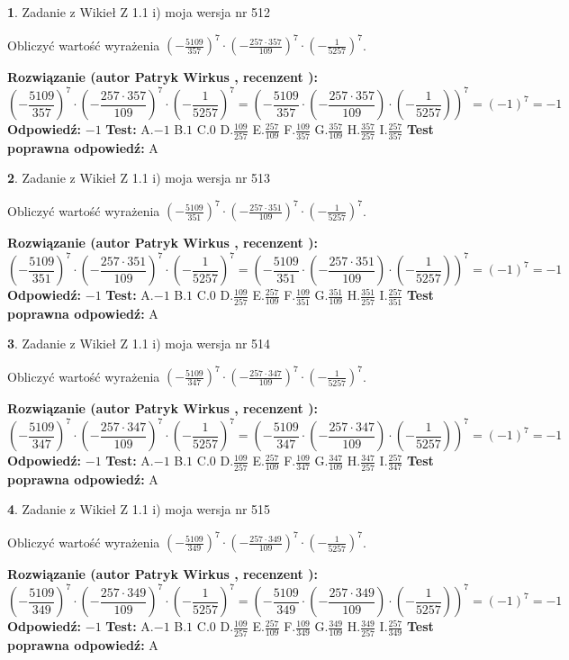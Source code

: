 \documentclass[12pt, a4paper]{article}
\theoremstyle{definition} %
\newtheorem{zad}{}
\newcommand{\zadStart}[1]{\begin{zad}#1\newline}
\newcommand{\zadStop}{\end{zad}}
\newcommand{\rozwStart}[2]{\noindent \textbf{Rozwiązanie (autor #1 , recenzent #2): }\newline}
\newcommand{\rozwStop}{\newline}
\newcommand{\odpStart}{\noindent \textbf{Odpowiedź:}\newline}
\newcommand{\odpStop}{\newline}
\newcommand{\testStart}{\noindent \textbf{Test:}\newline}
\newcommand{\testStop}{\newline}
\newcommand{\kluczStart}{\noindent \textbf{Test poprawna odpowiedź:}\newline}
\newcommand{\kluczStop}{\newline}
\begin{document}
\zadStart{Zadanie z Wikieł Z 1.1 i) moja wersja nr 512}

Obliczyć wartość wyrażenia $(-\frac{5109}{357})^{7} \cdot (-\frac{257 \cdot 357}{109})^{7} \cdot (-\frac{1}{5257})^{7}$.
\zadStop
\rozwStart{Patryk Wirkus}{}
$$(-\frac{5109}{357})^{7} \cdot (-\frac{257 \cdot 357}{109})^{7} \cdot (-\frac{1}{5257})^{7} = (-\frac{5109}{357} \cdot (-\frac{257 \cdot 357}{109}) \cdot (-\frac{1}{5257}))^{7} = (-1)^{7} = -1$$
\rozwStop
\odpStart
$-1$
\odpStop
\testStart
A.$-1$ B.$1$ C.$0$ D.$\frac{109}{257}$ E.$\frac{257}{109}$
F.$\frac{109}{357}$ G.$\frac{357}{109}$
H.$\frac{357}{257}$
I.$\frac{257}{357}$
\testStop
\kluczStart
A
\kluczStop



\zadStart{Zadanie z Wikieł Z 1.1 i) moja wersja nr 513}

Obliczyć wartość wyrażenia $(-\frac{5109}{351})^{7} \cdot (-\frac{257 \cdot 351}{109})^{7} \cdot (-\frac{1}{5257})^{7}$.
\zadStop
\rozwStart{Patryk Wirkus}{}
$$(-\frac{5109}{351})^{7} \cdot (-\frac{257 \cdot 351}{109})^{7} \cdot (-\frac{1}{5257})^{7} = (-\frac{5109}{351} \cdot (-\frac{257 \cdot 351}{109}) \cdot (-\frac{1}{5257}))^{7} = (-1)^{7} = -1$$
\rozwStop
\odpStart
$-1$
\odpStop
\testStart
A.$-1$ B.$1$ C.$0$ D.$\frac{109}{257}$ E.$\frac{257}{109}$
F.$\frac{109}{351}$ G.$\frac{351}{109}$
H.$\frac{351}{257}$
I.$\frac{257}{351}$
\testStop
\kluczStart
A
\kluczStop



\zadStart{Zadanie z Wikieł Z 1.1 i) moja wersja nr 514}

Obliczyć wartość wyrażenia $(-\frac{5109}{347})^{7} \cdot (-\frac{257 \cdot 347}{109})^{7} \cdot (-\frac{1}{5257})^{7}$.
\zadStop
\rozwStart{Patryk Wirkus}{}
$$(-\frac{5109}{347})^{7} \cdot (-\frac{257 \cdot 347}{109})^{7} \cdot (-\frac{1}{5257})^{7} = (-\frac{5109}{347} \cdot (-\frac{257 \cdot 347}{109}) \cdot (-\frac{1}{5257}))^{7} = (-1)^{7} = -1$$
\rozwStop
\odpStart
$-1$
\odpStop
\testStart
A.$-1$ B.$1$ C.$0$ D.$\frac{109}{257}$ E.$\frac{257}{109}$
F.$\frac{109}{347}$ G.$\frac{347}{109}$
H.$\frac{347}{257}$
I.$\frac{257}{347}$
\testStop
\kluczStart
A
\kluczStop



\zadStart{Zadanie z Wikieł Z 1.1 i) moja wersja nr 515}

Obliczyć wartość wyrażenia $(-\frac{5109}{349})^{7} \cdot (-\frac{257 \cdot 349}{109})^{7} \cdot (-\frac{1}{5257})^{7}$.
\zadStop
\rozwStart{Patryk Wirkus}{}
$$(-\frac{5109}{349})^{7} \cdot (-\frac{257 \cdot 349}{109})^{7} \cdot (-\frac{1}{5257})^{7} = (-\frac{5109}{349} \cdot (-\frac{257 \cdot 349}{109}) \cdot (-\frac{1}{5257}))^{7} = (-1)^{7} = -1$$
\rozwStop
\odpStart
$-1$
\odpStop
\testStart
A.$-1$ B.$1$ C.$0$ D.$\frac{109}{257}$ E.$\frac{257}{109}$
F.$\frac{109}{349}$ G.$\frac{349}{109}$
H.$\frac{349}{257}$
I.$\frac{257}{349}$
\testStop
\kluczStart
A
\kluczStop
\end{document}
